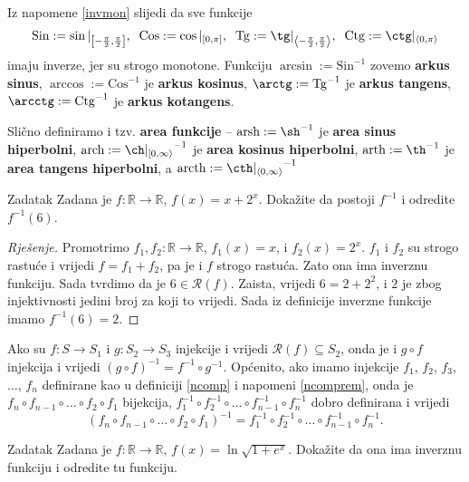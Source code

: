 Iz napomene \ref{invmon} slijedi da sve funkcije \[\mathrm{Sin}:=\sin|_{\left[-\frac{\pi}{2},\frac{\pi}{2}\right]},\;\;\mathrm{Cos}:=\cos|_{\left[0, \pi\right]},\;\;\mathrm{Tg}:=\tg|_{\left\langle-\frac{\pi}{2},\frac{\pi}{2}\right\rangle},\;\;\mathrm{Ctg}:=\ctg|_{\left\langle 0, \pi\right\rangle}\]
imaju inverze, jer su strogo monotone. Funkciju \(\arcsin:=\mathrm{Sin}^{-1}\) zovemo \textbf{arkus sinus}, \(\arccos:=\mathrm{Cos}^{-1}\) je \textbf{arkus kosinus}, \(\arctg:=\mathrm{Tg}^{-1}\) je \textbf{arkus tangens}, \(\arcctg:=\mathrm{Ctg}^{-1}\) je \textbf{arkus kotangens}.

Slično definiramo i tzv. \textbf{area funkcije} -- \(\mathrm{arsh}:=\sh^{-1}\) je \textbf{area sinus hiperbolni}, \(\mathrm{arch}:={\ch|_{[0, \infty\rangle}}^{-1}\) je \textbf{area kosinus hiperbolni}, \(\mathrm{arth}:=\th^{-1}\) je \textbf{area tangens hiperbolni}, a \(\mathrm{arcth}:={\cth|_{\langle 0, \infty\rangle}}^{-1}\)
\begin{exercise}{Zadatak}
Zadana je \(f : \mathbb{R}\to \mathbb{R}\), \(f(x)=x+2^x\). Dokažite da postoji \(f^{-1}\) i odredite \(f^{-1}(6)\).
\end{exercise}
\begin{proof}[Rješenje]
Promotrimo \(f_1, f_2 : \mathbb{R}\to \mathbb{R}\), \(f_1(x)=x\), i \(f_2(x)=2^x\). \(f_1\) i \(f_2\) su strogo rastuće i vrijedi \(f=f_1+f_2\), pa je i \(f\) strogo rastuća. Zato ona ima inverznu funkciju. Sada tvrdimo da je \(6\in \mathcal{R}(f)\). Zaista, vrijedi \(6=2+2^2\), i \(2\) je zbog injektivnosti jedini broj za koji to vrijedi. Sada iz definicije inverzne funkcije imamo \(f^{-1}(6)=2\).
\end{proof}
\begin{remark}
Ako su \(f : S\to S_1\) i \(g : S_2 \to S_3\) injekcije i vrijedi \(\mathcal{R}(f)\subseteq S_2\), onda je i \(g\circ f\) injekcija i vrijedi \((g\circ f)^{-1}=f^{-1}\circ g^{-1}\). Općenito, ako imamo injekcije \(f_1\), \(f_2\), \(f_3\), \(\dots\), \(f_n\) definirane kao u definiciji \ref{ncomp} i napomeni \ref{ncomprem}, onda je \(f_n\circ f_{n-1}\circ\dots\circ f_2\circ f_1\) bijekcija, \(f_1^{-1}\circ f_2^{-1}\circ \dots \circ f_{n-1}^{-1}\circ f_n^{-1}\) dobro definirana i vrijedi
\[(f_n\circ f_{n-1}\circ\dots\circ f_2\circ f_1)^{-1}=f_1^{-1}\circ f_2^{-1}\circ \dots \circ f_{n-1}^{-1}\circ f_n^{-1}.\]
\end{remark}
\begin{exercise}{Zadatak}
Zadana je \(f : \mathbb{R}\to \mathbb{R}\), \(f(x)=\ln{\sqrt{1+e^x}}\). Dokažite da ona ima inverznu funkciju i odredite tu funkciju.
\end{exercise}
